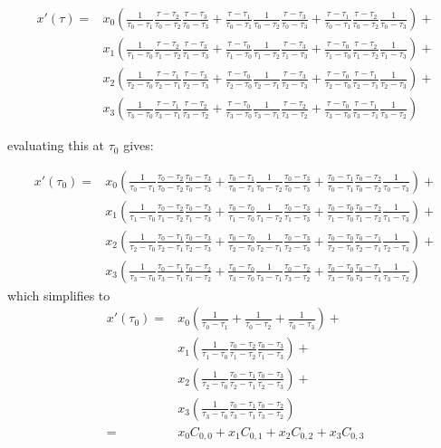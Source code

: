 \documentclass[a4paper,12pt]{article}
\newcommand{\taus}[3]{\frac{\tau_{#1}-\tau_{#2}}{\tau_{#3}-\tau_{#2}}}
\newcommand{\taud}[3]{\frac{1}{\tau_{#3}-\tau_{#2}}}
\begin{document}
\begin{align}
x'(\tau) = &x_0 (\taud{}{1}{0} \taus{}{2}{0} \taus{}{3}{0}
               + \taus{}{1}{0} \taud{}{2}{0} \taus{}{3}{0}
               + \taus{}{1}{0} \taus{}{2}{0} \taud{}{3}{0}) + \\
           &x_1 (\taud{}{0}{1} \taus{}{2}{1} \taus{}{3}{1}
               + \taus{}{0}{1} \taud{}{2}{1} \taus{}{3}{1}
               + \taus{}{0}{1} \taus{}{2}{1} \taud{}{3}{1}) + \\
           &x_2 (\taud{}{0}{2} \taus{}{1}{2} \taus{}{3}{2}
               + \taus{}{0}{2} \taud{}{1}{2} \taus{}{3}{2}
               + \taus{}{0}{2} \taus{}{1}{2} \taud{}{3}{2}) + \\
           &x_3 (\taud{}{0}{3} \taus{}{1}{3} \taus{}{2}{3}
               + \taus{}{0}{3} \taud{}{1}{3} \taus{}{2}{3}
               + \taus{}{0}{3} \taus{}{1}{3} \taud{}{2}{3})
\end{align}

evaluating this at $\tau_0$ gives:

\begin{align}
x'(\tau_0) = &x_0 (\taud{0}{1}{0} \taus{0}{2}{0} \taus{0}{3}{0}
                 + \taus{0}{1}{0} \taud{0}{2}{0} \taus{0}{3}{0}
                 + \taus{0}{1}{0} \taus{0}{2}{0} \taud{0}{3}{0}) +\\
             &x_1 (\taud{0}{0}{1} \taus{0}{2}{1} \taus{0}{3}{1}
                 + \taus{0}{0}{1} \taud{0}{2}{1} \taus{0}{3}{1}
                 + \taus{0}{0}{1} \taus{0}{2}{1} \taud{0}{3}{1}) +\\
             &x_2 (\taud{0}{0}{2} \taus{0}{1}{2} \taus{0}{3}{2}
                 + \taus{0}{0}{2} \taud{0}{1}{2} \taus{0}{3}{2}
                 + \taus{0}{0}{2} \taus{0}{1}{2} \taud{0}{3}{2}) +\\
             &x_3 (\taud{0}{0}{3} \taus{0}{1}{3} \taus{0}{2}{3}
                 + \taus{0}{0}{3} \taud{0}{1}{3} \taus{0}{2}{3}
                 + \taus{0}{0}{3} \taus{0}{1}{3} \taud{0}{2}{3})
\end{align}
which simplifies to
\begin{align}
x'(\tau_0) = &x_0 (\taud{0}{1}{0}
                 + \taud{0}{2}{0}
                 + \taud{0}{3}{0}) +\\
             &x_1 (\taud{0}{0}{1} \taus{0}{2}{1} \taus{0}{3}{1}) +\\
             &x_2 (\taud{0}{0}{2} \taus{0}{1}{2} \taus{0}{3}{2}) +\\
             &x_3 (\taud{0}{0}{3} \taus{0}{1}{3} \taus{0}{2}{3}) \\
= & x_0 C_{0,0} + x_1 C_{0,1} + x_2 C_{0,2} + x_3 C_{0,3}
\end{align}
\end{document}
